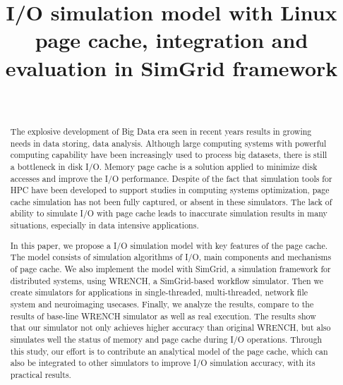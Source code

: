 \documentclass[conference]{IEEEtran}
\begin{document}
\title{I/O simulation model with Linux page cache, integration and evaluation in SimGrid framework}

\author{\\
}

\maketitle

	\begin{abstract}
		
		The explosive development of Big Data era seen in recent years results in 
		growing needs in data storing, data analysis. 
		Although large computing systems with powerful computing capability 
		have been increasingly used to process big datasets, there is still a bottleneck 
		in disk I/O. 
		Memory page cache is a solution applied to minimize disk accesses and 
		improve the I/O performance. 
		Despite of the fact that simulation tools for HPC have been developed to 
		support studies in computing systems optimization, page cache simulation 
		has not been fully captured, or absent in these simulators. 
		The lack of ability to simulate I/O with page cache leads to inaccurate 
		simulation results in many situations, especially in data intensive applications. 
		
		In this paper, we propose a I/O simulation model with key features of the page cache.
		The model consists of simulation algorithms of I/O, main components 
		and mechanisms of page cache.
		We also implement the model with SimGrid, a simulation framework for 
		distributed systems, using WRENCH, a SimGrid-based workflow simulator. 
		Then we create simulators for applications in single-threaded, multi-threaded,
		network file system and neuroimaging usecases.
		Finally, we analyze the results, compare to the results of base-line WRENCH 
		simulator as well as real execution.
		The results show that our simulator not only achieves higher accuracy than 
		original WRENCH, but also simulates well the status of memory and 
		page cache during I/O operations. 
		Through this study, our effort is to contribute an analytical model 
		of the page cache, which can also be integrated to other simulators 
		to improve I/O simulation accuracy, with its practical results. 
		
	\end{abstract}		 
\end{document}
